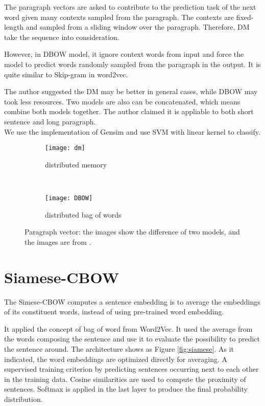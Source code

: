 The paragraph vectors are asked to contribute to the prediction task of the next word given many contexts sampled from the paragraph.
The contexts are fixed-length and sampled from a sliding window over the paragraph. Therefore, DM take the sequence into consideration.

However, in DBOW model, it ignore context words from input and force the model to predict words randomly sampled from the paragraph in the output.
It is quite similar to Skip-gram in word2vec.

The author suggested the DM may be better in general cases, while DBOW may took less resources. 
Two models are also can be concatenated, which means combine both models together. 
The author claimed it is appliable to  both short sentence and long paragraph.\\

We use the implementation of Gensim and use SVM with linear kernel to classify.

\begin{figure}
\centering
\begin{subfigure}{.5\textwidth}
  \centering
  \texttt{[image: dm]}
  \caption{distributed memory}
  \label{fig:dm}
\end{subfigure}~
\begin{subfigure}{.5\textwidth}
  \centering
  \texttt{[image: DBOW]}
  \caption{distributed bag of words}
  \label{fig:dbow}
\end{subfigure}
\caption{Paragraph vector: the images show the difference of two models, and the images are from \cite{PVDM}.}
\label{fig:PVDM}
\end{figure}

\section{Siamese-CBOW}

	The Simese-CBOW\cite{kenter2016siamesecbow} computes a sentence embedding is to average the embeddings of its
constituent words, instead of using pre-trained word embedding. 

It applied the concept of bag of word from Word2Vec. It used the average from the words composing the sentence and use it to evaluate the possibility to predict the sentence around. 
The architecture shows as Figure \ref{fig:siamese}. As it indicated, the word embeddings are optimized directly for averaging.
A supervised training criterion by predicting sentences occurring next to each other in the training data.
Cosine similarities are used to compute the proximity of sentences.
Softmax is applied in the last layer to produce the final probability distribution.

